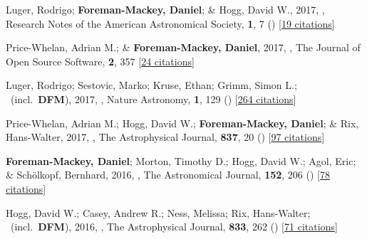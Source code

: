 \item[{\color{numcolor}\scriptsize28}] Luger, Rodrigo; \textbf{Foreman-Mackey, Daniel}; \& Hogg, David W., 2017, , Research Notes of the American Astronomical Society, \textbf{1}, 7 () [\href{https://ui.adsabs.harvard.edu/abs/2017RNAAS...1....7L}{19 citations}]

\item[{\color{numcolor}\scriptsize27}] Price-Whelan, Adrian M.; \& \textbf{Foreman-Mackey, Daniel}, 2017, , The Journal of Open Source Software, \textbf{2}, 357 [\href{https://ui.adsabs.harvard.edu/abs/2017JOSS....2..357P}{24 citations}]

\item[{\color{numcolor}\scriptsize26}] Luger, Rodrigo; Sestovic, Marko; Kruse, Ethan; Grimm, Simon L.; \etal\ (incl.\ \textbf{DFM}), 2017, , Nature Astronomy, \textbf{1}, 129 () [\href{https://ui.adsabs.harvard.edu/abs/2017NatAs...1E.129L}{264 citations}]

\item[{\color{numcolor}\scriptsize25}] Price-Whelan, Adrian M.; Hogg, David W.; \textbf{Foreman-Mackey, Daniel}; \& Rix, Hans-Walter, 2017, , The Astrophysical Journal, \textbf{837}, 20 () [\href{https://ui.adsabs.harvard.edu/abs/2017ApJ...837...20P}{97 citations}]

\item[{\color{numcolor}\scriptsize24}] \textbf{Foreman-Mackey, Daniel}; Morton, Timothy D.; Hogg, David W.; Agol, Eric; \& Sch{\"o}lkopf, Bernhard, 2016, , The Astronomical Journal, \textbf{152}, 206 () [\href{https://ui.adsabs.harvard.edu/abs/2016AJ....152..206F}{78 citations}]

\item[{\color{numcolor}\scriptsize23}] Hogg, David W.; Casey, Andrew R.; Ness, Melissa; Rix, Hans-Walter; \etal\ (incl.\ \textbf{DFM}), 2016, , The Astrophysical Journal, \textbf{833}, 262 () [\href{https://ui.adsabs.harvard.edu/abs/2016ApJ...833..262H}{71 citations}]

